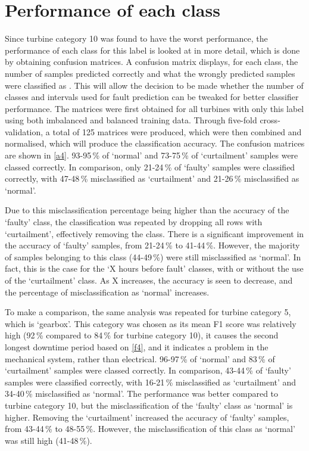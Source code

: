 \section{Performance of each class}

Since turbine category 10 was found to have the worst performance, the performance of each class for this label is looked at in more detail, which is done by obtaining confusion matrices. A confusion matrix displays, for each class, the number of samples predicted correctly and what the wrongly predicted samples were classified as \cite{33M}. This will allow the decision to be made whether the number of classes and intervals used for fault prediction can be tweaked for better classifier performance. The matrices were first obtained for all turbines with only this label using both imbalanced and balanced training data. Through five-fold cross-validation, a total of 125 matrices were produced, which were then combined and normalised, which will produce the classification accuracy. The confusion matrices are shown in \autoref{a4}. 93-95\,\% of `normal' and 73-75\,\% of `curtailment' samples were classed correctly. In comparison, only 21-24\,\% of `faulty' samples were classified correctly, with 47-48\,\% misclassified as `curtailment' and 21-26\,\% misclassified as `normal'.

Due to this misclassification percentage being higher than the accuracy of the `faulty' class, the classification was repeated by dropping all rows with `curtailment', effectively removing the class. There is a significant improvement in the accuracy of `faulty' samples, from 21-24\,\% to 41-44\,\%. However, the majority of samples belonging to this class (44-49\,\%) were still misclassified as `normal'. In fact, this is the case for the `X hours before fault' classes, with or without the use of the `curtailment' class. As X increases, the accuracy is seen to decrease, and the percentage of misclassification as `normal' increases.

To make a comparison, the same analysis was repeated for turbine category 5, which is `gearbox'. This category was chosen as its mean F1 score was relatively high (92\,\% compared to 84\,\% for turbine category 10), it causes the second longest downtime period based on \autoref{f4}, and it indicates a problem in the mechanical system, rather than electrical. 96-97\,\% of `normal' and 83\,\% of `curtailment' samples were classed correctly. In comparison, 43-44\,\% of `faulty' samples were classified correctly, with 16-21\,\% misclassified as `curtailment' and 34-40\,\% misclassified as `normal'. The performance was better compared to turbine category 10, but the misclassification of the `faulty' class as `normal' is higher. Removing the `curtailment' increased the accuracy of `faulty' samples, from 43-44\,\% to 48-55\,\%. However, the misclassification of this class as `normal' was still high (41-48\,\%).

